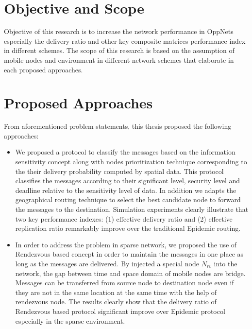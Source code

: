 \section{Objective and Scope}
\label{intro:Objective and Scope}
Objective of this research is to increase the network performance in OppNets especially the delivery ratio and other key composite matrices performance index in different schemes.
The scope of this research is based on the assumption of mobile nodes and environment in different network schemes that elaborate in each proposed approaches.

\section{Proposed Approaches}
\label{intro:Proposed Approaches}
From aforementioned problem statements, this thesis proposed the following approaches:
\begin{itemize}
  \item %
  We proposed a protocol to classify the messages based on the information sensitivity concept along with nodes prioritization technique corresponding to the their delivery probability computed by spatial data. 
  This protocol classifies the messages according to their significant level, security level and deadline relative to the sensitivity level of data. 
  In addition we adapts the geographical routing technique to select the best candidate node to forward the messages to the destination. 
  Simulation experiments clearly illustrate that two key performance indexes: (1) effective delivery ratio and (2) effective replication ratio remarkably improve over the traditional Epidemic routing. 
  
  
  \item %
In order to address the problem in sparse network, we proposed the use of Rendezvous based concept in order to maintain the messages in one place as long as the messages are delivered. 
By injected a special node $N_{rv}$ into the network, the gap between time and space domain of mobile nodes are bridge. Messages can be transferred from source node to destination node even if they are not in the same location at the same time with the help of rendezvous node. 
The results clearly show that the delivery ratio of Rendezvous based protocol significant improve over Epidemic protocol especially in the sparse environment.
\end{itemize}

